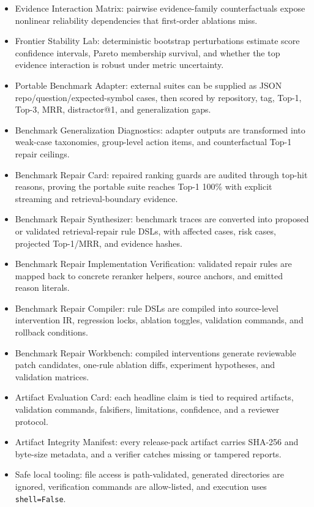 \documentclass[UTF8,12pt,openany]{ctexbook}
\begin{document}
\begin{itemize}
\item Evidence Interaction Matrix: pairwise evidence-family counterfactuals expose nonlinear reliability dependencies that first-order ablations miss.
\item Frontier Stability Lab: deterministic bootstrap perturbations estimate score confidence intervals, Pareto membership survival, and whether the top evidence interaction is robust under metric uncertainty.
\item Portable Benchmark Adapter: external suites can be supplied as JSON repo/question/expected-symbol cases, then scored by repository, tag, Top-1, Top-3, MRR, distractor@1, and generalization gaps.
\item Benchmark Generalization Diagnostics: adapter outputs are transformed into weak-case taxonomies, group-level action items, and counterfactual Top-1 repair ceilings.
\item Benchmark Repair Card: repaired ranking guards are audited through top-hit reasons, proving the portable suite reaches Top-1 100\% with explicit streaming and retrieval-boundary evidence.
\item Benchmark Repair Synthesizer: benchmark traces are converted into proposed or validated retrieval-repair rule DSLs, with affected cases, risk cases, projected Top-1/MRR, and evidence hashes.
\item Benchmark Repair Implementation Verification: validated repair rules are mapped back to concrete reranker helpers, source anchors, and emitted reason literals.
\item Benchmark Repair Compiler: rule DSLs are compiled into source-level intervention IR, regression locks, ablation toggles, validation commands, and rollback conditions.
\item Benchmark Repair Workbench: compiled interventions generate reviewable patch candidates, one-rule ablation diffs, experiment hypotheses, and validation matrices.
\item Artifact Evaluation Card: each headline claim is tied to required artifacts, validation commands, falsifiers, limitations, confidence, and a reviewer protocol.
\item Artifact Integrity Manifest: every release-pack artifact carries SHA-256 and byte-size metadata, and a verifier catches missing or tampered reports.
\item Safe local tooling: file access is path-validated, generated directories are ignored, verification commands are allow-listed, and execution uses \texttt{shell=False}.

\end{itemize}
\end{document}

